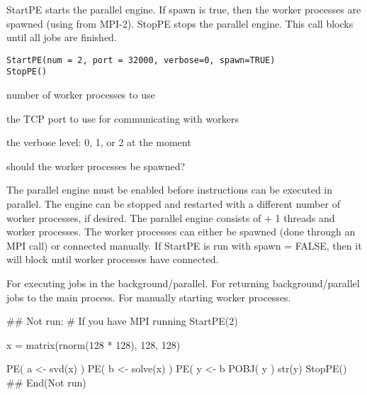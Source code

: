 \begin{Description}\relax
StartPE starts the parallel engine.  If spawn is true, then the worker
processes are spawned (using  from MPI-2).
StopPE stops the parallel engine.  This call blocks until all jobs
are finished.
\end{Description}
\begin{Usage}
\begin{verbatim}
StartPE(num = 2, port = 32000, verbose=0, spawn=TRUE)
StopPE()
\end{verbatim}
\end{Usage}
\begin{Arguments}
\begin{ldescription}
\item[\code{num}] number of worker processes to use 
\item[\code{port}] the TCP port to use for communicating with workers 
\item[\code{verbose}] the verbose level: 0, 1, or 2 at the moment 
\item[\code{spawn}] should the worker processes be spawned? 
\end{ldescription}
\end{Arguments}
\begin{Details}\relax
The parallel engine must be enabled before instructions can be executed
in parallel.  The engine can be stopped and restarted with a different
number of worker processes, if desired.
The parallel engine consists of  + 1 threads and 
worker processes.  The worker processes can either be spawned (done
through an MPI call) or connected manually.  If StartPE is run with
spawn = FALSE, then it will block until  worker processes
have connected.
\end{Details}
\begin{SeeAlso}\relax
{}  For executing jobs in the background/parallel.
  For returning background/parallel jobs to the main process.
  For manually starting worker processes.
\end{SeeAlso}
\begin{Examples}
\begin{ExampleCode}
## Not run: 
# If you have MPI running
StartPE(2)

x = matrix(rnorm(128 * 128), 128, 128)

PE( a <- svd(x) )
PE( b <- solve(x) )
PE( y <- b %
POBJ( y )
str(y)
StopPE()
## End(Not run)
\end{ExampleCode}
\end{Examples}

